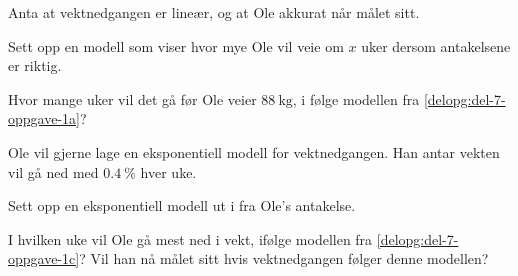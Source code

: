 Anta at vektnedgangen er lineær, og at Ole akkurat når målet sitt.

\begin{oppgaver}
     Sett opp en modell som viser hvor mye Ole vil veie om $x$ uker
    dersom antakelsene er riktig.
    \label{delopg:del-7-oppgave-1a}
\end{oppgaver}

\begin{oppgaver}
     Hvor mange uker vil det gå før Ole veier $\SI{88}{\kg}$, i følge
    modellen fra \cref{delopg:del-7-oppgave-1a}?
\end{oppgaver}

Ole vil gjerne lage en eksponentiell modell for vektnedgangen. Han antar vekten
vil gå ned med $\SI{0.4}{\percent}$ hver uke.

\begin{oppgaver}
     Sett opp en eksponentiell modell ut i fra Ole's antakelse.
    \label{delopg:del-7-oppgave-1c}
\end{oppgaver}

\begin{oppgaver}
     I hvilken uke vil Ole gå mest ned i vekt, ifølge modellen fra
    \cref{delopg:del-7-oppgave-1c}?
    Vil han nå målet sitt hvis vektnedgangen følger denne modellen?
\end{oppgaver}


\Oppgave[4] %

\begin{figure}[H]
    \centering
    \begin{subfigure}[b]{0.32\textwidth}
        \centering
        \caption{}
        \label{fig:del-1-oppgave-8-a}
    \end{subfigure}\hfill%
    \begin{subfigure}[b]{0.32\textwidth}
        \centering
        \caption{}
        \label{fig:del-1-oppgave-8-b}
    \end{subfigure}\hfill%
    \begin{subfigure}[b]{0.32\textwidth}
        \centering
        \vspace{-0.45cm}
        \caption{}
        \label{fig:del-1-oppgave-8-c}
    \end{subfigure}
    \caption{}\label{fig:del-1-oppgave-8}
\end{figure}

